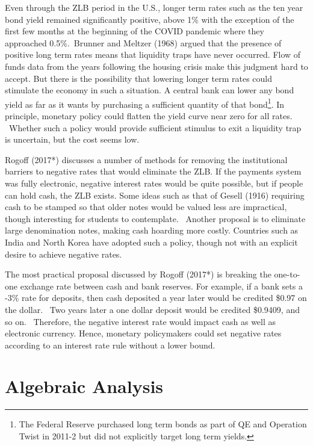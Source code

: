 \documentclass{article}
\begin{document}
\begin{doublespace}
Even through the ZLB period in the U.S., longer term rates such as the ten
year bond yield remained significantly positive, above 1\% with the
exception of the first few months at the beginning of the COVID pandemic
where they approached 0.5\%.\ Brunner and Meltzer (1968) argued that the
presence of positive long term rates means that liquidity traps have never
occurred. Flow of funds data from the years following the housing crisis
make this judgment hard to accept. But there is the possibility that
lowering longer term rates could stimulate the economy in such a situation.
A central bank can lower any bond yield as far as it wants by purchasing a
sufficient quantity of that bond\footnote{%
The Federal Reserve purchased long term bonds as part of QE and Operation
Twist in 2011-2 but did not explicitly target long term yields.}. In
principle, monetary policy could flatten the yield curve near zero for all
rates. \ Whether such a policy would provide sufficient stimulus to exit a
liquidity trap is uncertain, but the cost seems low. \ 

Rogoff (2017*) discusses a number of methods for removing the institutional
barriers to negative rates that would eliminate the ZLB. If the payments
system was fully electronic, negative interest rates would be quite
possible, but if people can hold cash, the ZLB exists. Some ideas such as
that of Gesell (1916) requiring cash to be stamped so that older notes would
be valued less are impractical, though interesting for students to
contemplate. \ Another proposal is to eliminate large denomination notes,
making cash hoarding more costly. Countries such as India and North Korea
have adopted such a policy, though not with an explicit desire to achieve
negative rates.

The most practical proposal discussed by Rogoff (2017*) is breaking the
one-to-one exchange rate between cash and bank reserves. For example, if a
bank sets a -3\% rate for deposits, then cash deposited a year later would
be credited \$0.97 on the dollar. \ Two years later a one dollar deposit
would be credited \$0.9409, and so on. \ Therefore, the negative interest
rate would impact cash as well as electronic currency. Hence, monetary
policymakers could set negative rates according to an interest rate rule
without a lower bound.

\section{Algebraic Analysis}


\end{doublespace}
\end{document}
